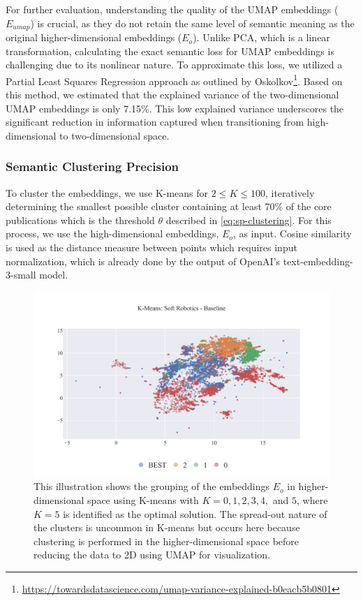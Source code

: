 For further evaluation, understanding the quality of the UMAP embeddings ($E_{umap}$) is crucial, as they do not retain the same level of semantic meaning as the original higher-dimensional embeddings ($E_o$). Unlike PCA, which is a linear transformation, calculating the exact semantic loss for UMAP embeddings is challenging due to its nonlinear nature. To approximate this loss, we utilized a Partial Least Squares Regression approach as outlined by Oskolkov\footnote{\url{https://towardsdatascience.com/umap-variance-explained-b0eacb5b0801}}. Based on this method, we estimated that the explained variance of the two-dimensional UMAP embeddings is only 7.15\%. This low explained variance underscores the significant reduction in information captured when transitioning from high-dimensional to two-dimensional space.


\subsubsection{Semantic Clustering Precision}

To cluster the embeddings, we use K-means for $2 \leq K \leq 100$, iteratively determining the smallest possible cluster containing at least 70\% of the core publications which is the threshold $\theta$ described in \autoref{eq:sp-clustering}. For this process, we use the high-dimensional embeddings, $E_o$, as input. Cosine similarity is used as the distance measure between points which requires input normalization, which is already done by the output of OpenAI's text-embedding-3-small model.

\begin{figure}[!hb]
	\centering	
	\includegraphics[scale=0.6]{pics/sr-clustering-baseline.pdf}
	\caption[Semantic Clustering: Soft Robotics]{This illustration shows the grouping of the embeddings $E_o$ in higher-dimensional space using K-means with $K = 0, 1, 2, 3, 4,$ and $5$, where $K=5$ is identified as the optimal solution. The spread-out nature of the clusters is uncommon in K-means but occurs here because clustering is performed in the higher-dimensional space before reducing the data to 2D using UMAP for visualization.}\label{fig:sr-clustering-baseline}
\end{figure}

